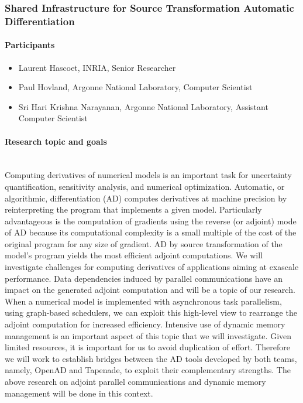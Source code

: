 

\subsubsection{Shared Infrastructure for Source Transformation Automatic Differentiation \ongoing}
\label{sec.report.autom-diff} 

\begin{refsection}

\paragraph{Participants}

\begin{itemize}
	\item Laurent Hascoet, INRIA, Senior Researcher
	\item Paul Hovland, Argonne National Laboratory, Computer Scientist
	\item Sri Hari Krishna Narayanan, Argonne National Laboratory, Assistant Computer Scientist
\end{itemize}


\paragraph{Research topic and goals}~\\

Computing derivatives of numerical models is an important task for uncertainty quantification, sensitivity analysis, and numerical optimization. Automatic, or algorithmic,  differentiation (AD) computes derivatives at machine precision by reinterpreting the program that implements a given model. Particularly advantageous is the computation of gradients using the reverse (or adjoint) mode of AD because its computational complexity is a small multiple of the cost of the original program for any size of gradient. AD by source transformation of the model’s program yields the most efficient adjoint computations.
We will investigate challenges for computing derivatives of applications aiming at exascale performance. Data dependencies induced by parallel communications have an impact on the generated adjoint computation and will be a topic of our research. When a numerical model is implemented with asynchronous task parallelism, using graph-based schedulers, we can exploit this high-level view to rearrange the adjoint computation for increased efficiency. Intensive use of dynamic memory management is an important aspect of this topic that we will investigate. 
Given limited resources, it is important for us to avoid duplication of effort. Therefore we will work to establish bridges between the AD tools developed by both teams, namely, OpenAD and Tapenade, to exploit their complementary strengths. The above research on adjoint parallel communications and dynamic memory management will be done in this context. 


\end{refsection}
